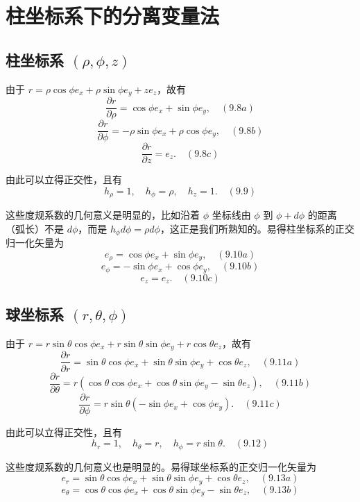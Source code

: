 \section{柱坐标系下的分离变量法}
\label{sec:cylindrical}

\subsection*{柱坐标系 $(\rho, \phi, z)$}

由于 $r = \rho \cos \phi e_x + \rho \sin \phi e_y + z e_z$，故有
\[
\frac{\partial r}{\partial \rho} = \cos \phi e_x + \sin \phi e_y, \quad (9.8a)
\]
\[
\frac{\partial r}{\partial \phi} = -\rho \sin \phi e_x + \rho \cos \phi e_y, \quad (9.8b)
\]
\[
\frac{\partial r}{\partial z} = e_z. \quad (9.8c)
\]

由此可以立得正交性，且有
\[
h_\rho = 1, \quad h_\phi = \rho, \quad h_z = 1. \quad (9.9)
\]

这些度规系数的几何意义是明显的，比如沿着 $\phi$ 坐标线由 $\phi$ 到 $\phi + d\phi$ 的距离（弧长）不是 $d\phi$，而是 $h_\phi d\phi = \rho d\phi$，这正是我们所熟知的。易得柱坐标系的正交归一化矢量为
\[
e_\rho = \cos \phi e_x + \sin \phi e_y, \quad (9.10a)
\]
\[
e_\phi = -\sin \phi e_x + \cos \phi e_y, \quad (9.10b)
\]
\[
e_z = e_z. \quad (9.10c)
\]

\subsection*{球坐标系 $(r, \theta, \phi)$}

由于 $r = r \sin \theta \cos \phi e_x + r \sin \theta \sin \phi e_y + r \cos \theta e_z$，故有
\[
\frac{\partial r}{\partial r} = \sin \theta \cos \phi e_x + \sin \theta \sin \phi e_y + \cos \theta e_z, \quad (9.11a)
\]
\[
\frac{\partial r}{\partial \theta} = r (\cos \theta \cos \phi e_x + \cos \theta \sin \phi e_y - \sin \theta e_z), \quad (9.11b)
\]
\[
\frac{\partial r}{\partial \phi} = r \sin \theta (-\sin \phi e_x + \cos \phi e_y). \quad (9.11c)
\]

由此可以立得正交性，且有
\[
h_r = 1, \quad h_\theta = r, \quad h_\phi = r \sin \theta. \quad (9.12)
\]

这些度规系数的几何意义也是明显的。易得球坐标系的正交归一化矢量为
\[
e_r = \sin \theta \cos \phi e_x + \sin \theta \sin \phi e_y + \cos \theta e_z, \quad (9.13a)
\]
\[
e_\theta
= \cos \theta \cos \phi e_x + \cos \theta \sin \phi e_y - \sin \theta e_z, \quad (9.13b)
\]